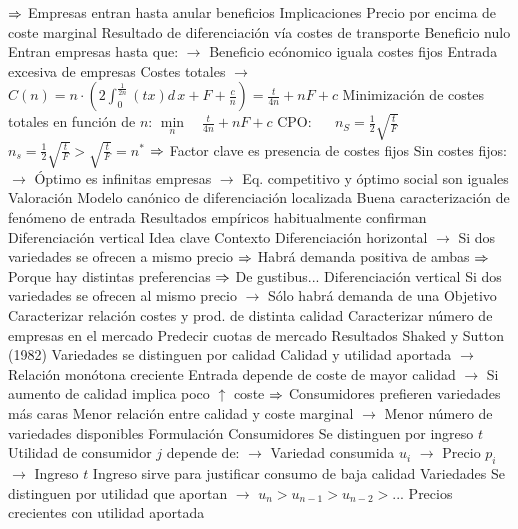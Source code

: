 \documentclass{nuevotema}
\begin{document}
\begin{esquemal}
				\4[] $\Rightarrow$ Empresas entran hasta anular beneficios
			\3 Implicaciones
				\4 Precio por encima de coste marginal
				\4[] Resultado de diferenciación vía costes de transporte
				\4 Beneficio nulo
				\4[] Entran empresas hasta que:
				\4[] $\to$ Beneficio ecónomico iguala costes fijos
				\4 Entrada excesiva de empresas
				\4[] Costes totales
				\4[] $\to$ $C(n) = n\cdot \left( 2 \int_0^\frac{1}{2n} (tx) d \, x + F + \frac{c}{n} \right) = \frac{t}{4n} + nF + c$
				\4[] Minimización de costes totales en función de $n$:
				\4[] $\underset{n}{\min} \quad \frac{t}{4n} + nF + c$
				\4[] CPO: $\quad$ $n_S = \frac{1}{2} \sqrt{\frac{t}{F}}$
				\4[] $n_s = \frac{1}{2} \sqrt{\frac{t}{F}} > \sqrt{\frac{t}{F}} = n^*$
				\4[] $\Rightarrow$ Factor clave es presencia de costes fijos
				\4[] Sin costes fijos:
				\4[] $\to$ Óptimo es infinitas empresas
				\4[] $\to$ Eq. competitivo y óptimo social son iguales
			\3 Valoración
				\4 Modelo canónico de diferenciación localizada
				\4 Buena caracterización de fenómeno de entrada
				\4 Resultados empíricos habitualmente confirman
		\2 Diferenciación vertical
			\3 Idea clave
				\4 Contexto
				\4[] Diferenciación horizontal
				\4[] $\to$ Si dos variedades se ofrecen a mismo precio
				\4[] $\Rightarrow$  Habrá demanda positiva de ambas
				\4[] $\Rightarrow$  Porque hay distintas preferencias
				\4[] $\Rightarrow$ De gustibus...
				\4[] Diferenciación vertical
				\4[] Si dos variedades se ofrecen al mismo precio
				\4[] $\to$ Sólo habrá demanda de una
				\4 Objetivo
				\4[] Caracterizar relación costes y prod. de distinta calidad
				\4[] Caracterizar número de empresas en el mercado
				\4[] Predecir cuotas de mercado
				\4 Resultados
				\4[] Shaked y Sutton (1982)
				\4[] Variedades se distinguen por calidad
				\4[] Calidad y utilidad aportada
				\4[] $\to$ Relación monótona creciente
				\4[] Entrada depende de coste de mayor calidad
				\4[] $\to$ Si aumento de calidad implica poco $\uparrow$ coste
				\4[] $\Rightarrow$ Consumidores prefieren variedades más caras
				\4[] Menor relación entre calidad y coste marginal
				\4[] $\to$ Menor número de variedades disponibles
			\3 Formulación
				\4 Consumidores
				\4[] Se distinguen por ingreso $t$
				\4[] Utilidad de consumidor $j$ depende de:
				\4[] $\to$ Variedad consumida $u_i$
				\4[] $\to$ Precio $p_i$
				\4[] $\to$ Ingreso $t$
				\4[] 
				\4[] Ingreso sirve para justificar consumo de baja calidad
				\4 Variedades
				\4[] Se distinguen por utilidad que aportan
				\4[] $\to$ $u_n > u_{n-1} > u_{n-2} > ...$
				\4[] Precios crecientes con utilidad aportada

\end{esquemal}
\end{document}
